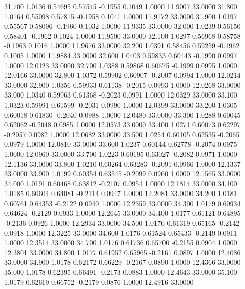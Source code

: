   31.700   1.0136   0.54695   0.57545  -0.1955   0.1049   1.0000  11.9007  33.0000
  31.800   1.0164   0.55098   0.57815  -0.1958   0.1041   1.0000  11.9172  33.0000
  31.900   1.0197   0.55567   0.58096  -0.1960   0.1032   1.0000  11.9335  33.0000
  32.000   1.0239   0.56150   0.58401  -0.1962   0.1024   1.0000  11.9500  33.0000
  32.100   1.0297   0.56968   0.58758  -0.1963   0.1016   1.0000  11.9676  33.0000
  32.200   1.0391   0.58456   0.59259  -0.1962   0.1005   1.0000  11.9884  33.0000
  32.600   1.0403   0.59833   0.60443  -0.1990   0.0997   1.0000  12.0123  33.0000
  32.700   1.0388   0.59868   0.60675  -0.1999   0.0995   1.0000  12.0166  33.0000
  32.800   1.0372   0.59902   0.60907  -0.2007   0.0994   1.0000  12.0214  33.0000
  32.900   1.0356   0.59933   0.61138  -0.2015   0.0993   1.0000  12.0268  33.0000
  33.000   1.0340   0.59963   0.61368  -0.2023   0.0991   1.0000  12.0329  33.0000
  33.100   1.0323   0.59991   0.61599  -0.2031   0.0990   1.0000  12.0399  33.0000
  33.200   1.0305   0.60018   0.61830  -0.2040   0.0988   1.0000  12.0480  33.0000
  33.300   1.0288   0.60045   0.62062  -0.2048   0.0985   1.0000  12.0573  33.0000
  33.400   1.0271   0.60073   0.62297  -0.2057   0.0982   1.0000  12.0682  33.0000
  33.500   1.0254   0.60105   0.62535  -0.2065   0.0979   1.0000  12.0810  33.0000
  33.600   1.0237   0.60144   0.62778  -0.2074   0.0975   1.0000  12.0960  33.0000
  33.700   1.0223   0.60195   0.63027  -0.2082   0.0971   1.0000  12.1136  33.0000
  33.800   1.0210   0.60264   0.63283  -0.2091   0.0966   1.0000  12.1337  33.0000
  33.900   1.0199   0.60354   0.63545  -0.2099   0.0960   1.0000  12.1565  33.0000
  34.000   1.0191   0.60468   0.63812  -0.2107   0.0954   1.0000  12.1814  33.0000
  34.100   1.0185   0.60604   0.64081  -0.2114   0.0947   1.0000  12.2081  33.0000
  34.200   1.0181   0.60761   0.64353  -0.2122   0.0940   1.0000  12.2359  33.0000
  34.300   1.0179   0.60934   0.64624  -0.2129   0.0933   1.0000  12.2645  33.0000
  34.400   1.0177   0.61121   0.64895  -0.2136   0.0926   1.0000  12.2934  33.0000
  34.500   1.0176   0.61319   0.65165  -0.2142   0.0918   1.0000  12.3225  33.0000
  34.600   1.0176   0.61524   0.65433  -0.2149   0.0911   1.0000  12.3514  33.0000
  34.700   1.0176   0.61736   0.65700  -0.2155   0.0904   1.0000  12.3801  33.0000
  34.800   1.0177   0.61952   0.65965  -0.2161   0.0897   1.0000  12.4086  33.0000
  34.900   1.0178   0.62172   0.66229  -0.2167   0.0890   1.0000  12.4366  33.0000
  35.000   1.0178   0.62395   0.66491  -0.2173   0.0883   1.0000  12.4643  33.0000
  35.100   1.0179   0.62619   0.66752  -0.2179   0.0876   1.0000  12.4916  33.0000
